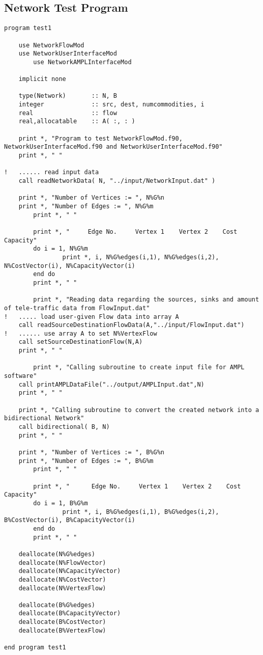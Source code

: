\documentclass[10pt,a4paper,margin = 1.25cm]{article}
\begin{document}
\subsection*{Network Test Program}
\begin{lstlisting}
program test1

    use NetworkFlowMod
    use NetworkUserInterfaceMod
		use NetworkAMPLInterfaceMod
		
    implicit none

    type(Network)       :: N, B
    integer             :: src, dest, numcommodities, i
    real                :: flow
    real,allocatable    :: A( :, : )
    
    print *, "Program to test NetworkFlowMod.f90, NetworkUserInterfaceMod.f90 and NetworkUserInterfaceMod.f90"
    print *, " "

!   ...... read input data
    call readNetworkData( N, "../input/NetworkInput.dat" )
    
    print *, "Number of Vertices := ", N%G%n
    print *, "Number of Edges := ", N%G%m
		print *, " "
		
		print *, "     Edge No.     Vertex 1    Vertex 2    Cost    Capacity"
		do i = 1, N%G%m
				print *, i, N%G%edges(i,1), N%G%edges(i,2), N%CostVector(i), N%CapacityVector(i)
		end do
		print *, " "
		
		print *, "Reading data regarding the sources, sinks and amount of tele-traffic data from FlowInput.dat"	
!   ..... load user-given Flow data into array A	
    call readSourceDestinationFlowData(A,"../input/FlowInput.dat")
!   ...... use array A to set N%VertexFlow 
    call setSourceDestinationFlow(N,A)
    print *, " "
    
		print *, "Calling subroutine to create input file for AMPL software"
    call printAMPLDataFile("../output/AMPLInput.dat",N)
    print *, " "
    
    print *, "Calling subroutine to convert the created network into a bidirectional Network"
    call bidirectional( B, N)
    print *, " "
    
    print *, "Number of Vertices := ", B%G%n
    print *, "Number of Edges := ", B%G%m
		print *, " "
		
		print *, "      Edge No.     Vertex 1    Vertex 2    Cost    Capacity"
		do i = 1, B%G%m
				print *, i, B%G%edges(i,1), B%G%edges(i,2), B%CostVector(i), B%CapacityVector(i)
		end do
		print *, " "
    
    deallocate(N%G%edges)
    deallocate(N%FlowVector)
    deallocate(N%CapacityVector)
    deallocate(N%CostVector)
    deallocate(N%VertexFlow)
    
    deallocate(B%G%edges)
    deallocate(B%CapacityVector)
    deallocate(B%CostVector)
    deallocate(B%VertexFlow)
    
end program test1

\end{lstlisting}
\end{document}
